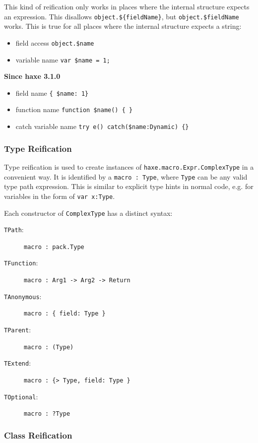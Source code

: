 \documentclass{article}
\newcommand{\type}[1]{\texttt{#1}}
\newcommand{\expr}[1]{\texttt{#1}}
\newcommand{\since}[1]{\noindent\textbf{Since haxe #1}\\}
\begin{document}
This kind of reification only works in places where the internal structure expects an expression. This disallows \expr{object.\$\{fieldName\}}, but \expr{object.\$fieldName} works. This is true for all places where the internal structure expects a string:

\begin{itemize}
	\item field access \expr{object.\$name}
	\item variable name \expr{var \$name = 1;}
\end{itemize}
\since{3.1.0}
\begin{itemize}
	\item field name \expr{\{ \$name: 1\} }
	\item function name \expr{function \$name() \{ \}}
	\item catch variable name \expr{try e() catch(\$name:Dynamic) \{\}}
\end{itemize}


\subsubsection{Type Reification}

Type reification is used to create instances of \type{haxe.macro.Expr.ComplexType} in a convenient way. It is identified by a \expr{macro : Type}, where \expr{Type} can be any valid type path expression. This is similar to explicit type hints in normal code, e.g. for variables in the form of \expr{var x:Type}.

Each constructor of \type{ComplexType} has a distinct syntax:

\begin{description}
	\item[\expr{TPath}:] \expr{macro : pack.Type}
	\item[\expr{TFunction}:] \expr{macro : Arg1 -> Arg2 -> Return}
	\item[\expr{TAnonymous}:] \expr{macro : \{ field: Type \}}
	\item[\expr{TParent}:] \expr{macro : (Type)}
	\item[\expr{TExtend}:] \expr{macro : \{> Type, field: Type \}}
	\item[\expr{TOptional}:] \expr{macro : ?Type}
\end{description}

\subsubsection{Class Reification}
\end{document}
